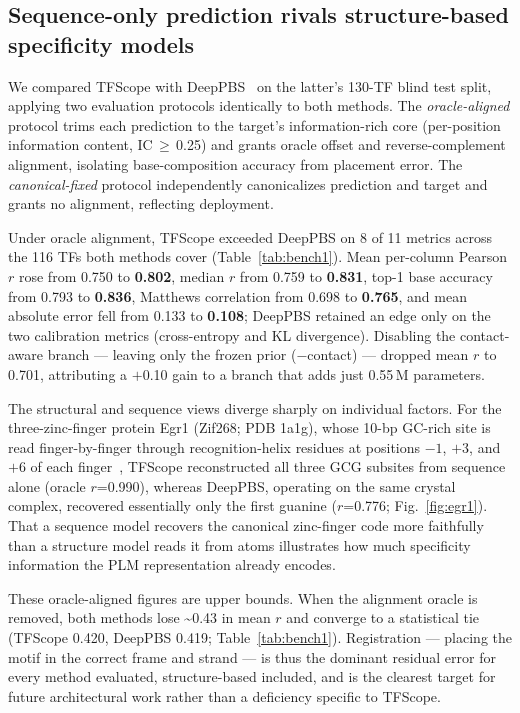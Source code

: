 \documentclass[11pt,letterpaper]{article}
\newcommand{\ts}{\textasciitilde}
\begin{document}
\subsection*{Sequence-only prediction rivals structure-based specificity models}

We compared TFScope with DeepPBS~\cite{Mitra2024} on the latter's 130-TF blind test
split, applying two evaluation protocols identically to both methods. The
\textit{oracle-aligned} protocol trims each prediction to the target's
information-rich core (per-position information content, IC\,$\geq$\,0.25) and
grants oracle offset and reverse-complement alignment, isolating base-composition
accuracy from placement error. The \textit{canonical-fixed} protocol independently
canonicalizes prediction and target and grants no alignment, reflecting deployment.

Under oracle alignment, TFScope exceeded DeepPBS on 8 of 11 metrics across the 116
TFs both methods cover (Table~\ref{tab:bench1}). Mean per-column Pearson $r$ rose
from 0.750 to \textbf{0.802}, median $r$ from 0.759 to \textbf{0.831}, top-1 base
accuracy from 0.793 to \textbf{0.836}, Matthews correlation from 0.698 to
\textbf{0.765}, and mean absolute error fell from 0.133 to \textbf{0.108}; DeepPBS
retained an edge only on the two calibration metrics (cross-entropy and KL
divergence). Disabling the contact-aware branch — leaving only the frozen prior
($-$contact) — dropped mean $r$ to 0.701, attributing a $+$0.10 gain to a branch
that adds just 0.55\,M parameters.

The structural and sequence views diverge sharply on individual factors. For the
three-zinc-finger protein Egr1 (Zif268; PDB 1a1g), whose 10-bp GC-rich site is read
finger-by-finger through recognition-helix residues at positions $-1$, $+3$, and
$+6$ of each finger~\cite{Pavletich1991,Wolfe2000}, TFScope reconstructed all three
GCG subsites from sequence alone (oracle $r$=0.990), whereas DeepPBS, operating on
the same crystal complex, recovered essentially only the first guanine
($r$=0.776; Fig.~\ref{fig:egr1}). That a sequence model recovers the canonical
zinc-finger code more faithfully than a structure model reads it from atoms
illustrates how much specificity information the PLM representation already
encodes.

These oracle-aligned figures are upper bounds. When the alignment oracle is removed,
both methods lose \ts0.43 in mean $r$ and converge to a statistical tie (TFScope
0.420, DeepPBS 0.419; Table~\ref{tab:bench1}). Registration — placing the motif in
the correct frame and strand — is thus the dominant residual error for every method
evaluated, structure-based included, and is the clearest target for future
architectural work rather than a deficiency specific to TFScope.
\end{document}
